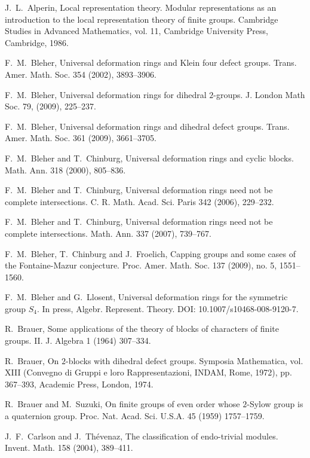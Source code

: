\documentclass{amsart}
\theoremstyle{plain}
\theoremstyle{definition}
\theoremstyle{remark}
\begin{document}
\begin{thebibliography}{88}

 J.~L.~Alperin, Local representation theory. Modular representations as an introduction to the local representation theory of finite groups. Cambridge Studies in Advanced Mathematics, vol. 11, Cambridge University Press, Cambridge, 1986.

 F.~M.~Bleher, Universal deformation rings and Klein four defect groups. Trans. Amer. Math. Soc. 354 (2002), 3893--3906.
	
 F.~M.~Bleher, Universal deformation rings for dihedral $2$-groups. 
J. London Math Soc. 79, (2009), 225--237. 

 F.~M.~Bleher, Universal deformation rings and dihedral defect groups. 
Trans. Amer. Math. Soc. 361 (2009), 3661--3705. 

 F.~M.~Bleher and T.~Chinburg, Universal deformation rings and cyclic blocks. Math. Ann. 318 (2000), 805--836.

 F.~M.~Bleher and T.~Chinburg, Universal deformation rings need not be
complete intersections. C. R. Math. Acad. Sci. Paris 342 (2006),  229--232.

 F.~M.~Bleher and T.~Chinburg, Universal deformation rings need not be complete intersections. Math. Ann. 337 (2007),  739--767.

 F.~M.~Bleher, T.~Chinburg and J.~Froelich, Capping groups and some cases of the 
Fontaine-Mazur conjecture.  Proc. Amer. Math. Soc.  137  (2009), no. 5, 1551--1560. 

 F.~M.~Bleher and G.~Llosent, Universal deformation rings for the symmetric group $S_4$.
In press, Algebr. Represent. Theory. DOI: 10.1007/s10468-008-9120-7.

 R.~Brauer, Some applications of the theory of blocks of characters of finite groups. II.  J. Algebra  1  (1964) 307--334.

 R.~Brauer, On $2$-blocks with dihedral defect groups. Symposia Mathematica, vol. XIII (Convegno di Gruppi e loro Rappresentazioni, INDAM, Rome, 1972), pp. 367--393, Academic Press, London, 1974. 

 R.~Brauer and M.~Suzuki, On finite groups of even order whose $2$-Sylow group is a quaternion group.  Proc. Nat. Acad. Sci. U.S.A.  45  (1959) 1757--1759.

 J.~F.~Carlson and J.~Th\'{e}venaz, The classification of endo-trivial modules.  
Invent. Math.  158  (2004),  389--411.


\end{thebibliography}
\end{document}
